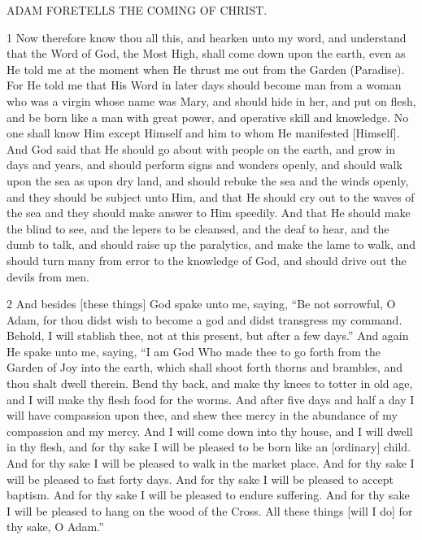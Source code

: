 \par ADAM FORETELLS THE COMING OF CHRIST.

\par 1 Now therefore know thou all this, and hearken unto my word, and understand that the Word of God, the Most High, shall come down upon the earth, even as He told me at the moment when He thrust me out from the Garden (Paradise). For He told me that His Word in later days should become man from a woman who was a virgin whose name was Mary, and should hide in her, and put on flesh, and be born like a man with great power, and operative skill and knowledge. No one shall know Him except Himself and him to whom He manifested [Himself]. And God said that He should go about with people on the earth, and grow in days and years, and should perform signs and wonders openly, and should walk upon the sea as upon dry land, and should rebuke the sea and the winds openly, and they should be subject unto Him, and that He should cry out to the waves of the sea and they should make answer to Him speedily. And that He should make the blind to see, and the lepers to be cleansed, and the deaf to hear, and the dumb to talk, and should raise up the paralytics, and make the lame to walk, and should turn many from error to the knowledge of God, and should drive out the devils from men.

\par 2 And besides [these things] God spake unto me, saying, “Be not sorrowful, O Adam, for thou didst wish to become a god and didst transgress my command. Behold, I will stablish thee, not at this present, but after a few days.” And again He spake unto me, saying, “I am God Who made thee to go forth from the Garden of Joy into the earth, which shall shoot forth thorns and brambles, and thou shalt dwell therein. Bend thy back, and make thy knees to totter in old age, and I will make thy flesh food for the worms. And after five days and half a day I will have compassion upon thee, and shew thee mercy in the abundance of my compassion and my mercy. And I will come down into thy house, and I will dwell in thy flesh, and for thy sake I will be pleased to be born like an [ordinary] child. And for thy sake I will be pleased to walk in the market place. And for thy sake I will be pleased to fast forty days. And for thy sake I will be pleased to accept baptism. And for thy sake I will be pleased to endure suffering. And for thy sake I will be pleased to hang on the wood of the Cross. All these things [will I do] for thy sake, O Adam.”

